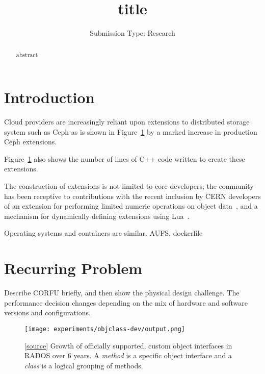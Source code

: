\documentclass[10pt,twocolumn]{article}
\begin{document}
\title{title}

\author{
\small Submission Type: Research
}

\date{}
\maketitle

\begin{abstract}
abstract
\end{abstract}

\section{Introduction}

Cloud providers are increasingly reliant upon extensions to distributed
storage system such as Ceph as is shown in Figure~\ref{fig:objclass-dev}
by a marked increase in production Ceph extensions.

Figure~\ref{fig:objclass-dev} also shows the number of lines of C++
code written to create these extensions.

The construction of extensions is not limited to core developers; the
community has been receptive to contributions with the recent inclusion by
CERN developers of an extension for performing limited numeric operations on
object data~\cite{cls_numops}, and a mechanism for dynamically defining
extensions using Lua~\cite{cls_lua}.

Operating systems and containers are similar. AUFS, dockerfile

\section{Recurring Problem}

Describe CORFU briefly, and then show the physical design challenge. The
performance decision changes depending on the mix of hardware and software
versions and configurations.



\begin{figure}[h]
  \centering
    \texttt{[image: experiments/objclass-dev/output.png]}
    \caption{
[\href{https://github.com/noahdesu/zlog-popper/tree/master/experiments/objclass-dev/visualize.ipynb}{source}]
Growth of officially supported, custom object interfaces in RADOS over 6
years. A \emph{method} is a specific object interface and a \emph{class} is a
logical grouping of methods.
}
\label{fig:objclass-dev}
\end{figure}
\end{document}

